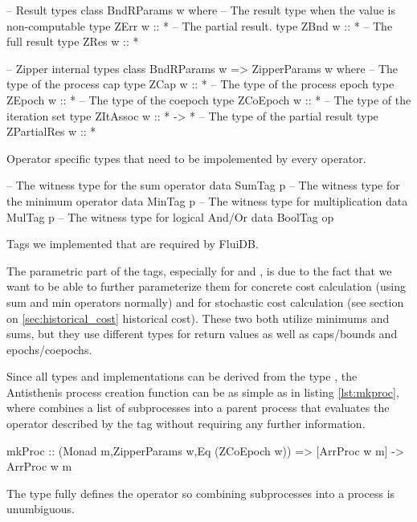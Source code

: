 \begin{code}
\begin{haskellcode}
-- Result types
class BndRParams w where
  -- The result type when the value is non-computable
  type ZErr w :: *
  -- The partial result.
  type ZBnd w :: *
  -- The full result
  type ZRes w :: *

-- Zipper internal types
class BndRParams w => ZipperParams w where
  -- The type of the process cap
  type ZCap w :: *
  -- The type of the process epoch
  type ZEpoch w :: *
  -- The type of the coepoch
  type ZCoEpoch w :: *
  -- The type of the iteration set
  type ZItAssoc w :: * -> *
  -- The type of the partial result
  type ZPartialRes w :: *
\end{haskellcode}
\label{lst:zipper_params}
\caption{Operator specific types that need to be impolemented by every operator.}
\end{code}

\begin{code}
\begin{haskellcode}
-- The witness type for the sum operator
data SumTag p
-- The witness type for the minimum operator
data MinTag p
-- The witness type for multiplication
data MulTag p
-- The witness type for logical And/Or
data BoolTag op
\end{haskellcode}
  \caption{\label{lst:tag_types}Tags we implemented that are required
    by FluiDB.}
\end{code}

The parametric part of the tags, especially for  and
, is due to the fact that we want to be able to further
parameterize them for concrete cost calculation (using sum and min
operators normally) and for stochastic cost calculation (see section
on \ref{sec:historical_cost} historical cost). These two both utilize
minimums and sums, but they use different types for return values as
well as caps/bounds and epochs/coepochs.

Since all types and implementations can be derived from the
 type , the Antisthenis process creation
function can be as simple as in listing \ref{lst:mkproc}, where
 combines a list of subprocesses into a parent process
that evaluates the operator described by the tag  without
requiring any further information.

\begin{code}
\begin{haskellcode}
mkProc
  :: (Monad m,ZipperParams w,Eq (ZCoEpoch w)) => [ArrProc w m] -> ArrProc w m
\end{haskellcode}
\label{lst:mkproc}
\caption{The type  fully defines the operator so combining
  subprocesses into a process is unumbiguous.}
\end{code}

